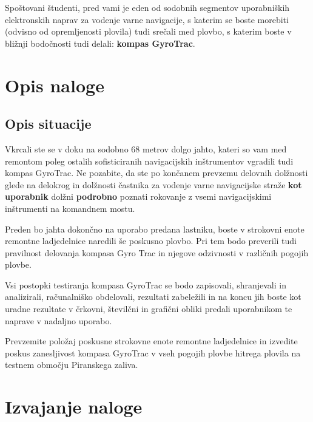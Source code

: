 Spoštovani študenti, pred vami je eden od sodobnih segmentov uporabniških elektronskih naprav za vodenje varne navigacije, s katerim se boste morebiti (odvisno od opremljenosti plovila) tudi srečali med plovbo, s katerim boste v bližnji bodočnosti tudi delali: \textbf{kompas GyroTrac}.

\section{Opis naloge}
\label{sec:VrtKompas_Nalog}

\subsection{Opis situacije}
\label{subsec:Nalog_Situac}
Vkrcali ste se v doku na sodobno 68 metrov dolgo jahto, kateri so vam med remontom poleg ostalih sofisticiranih navigacijskih inštrumentov vgradili tudi kompas GyroTrac. Ne pozabite, da ste po končanem prevzemu delovnih dolžnosti glede na delokrog in dolžnosti častnika za vodenje varne navigacijske straže \textbf{kot uporabnik} dolžni \textbf{podrobno} poznati rokovanje z vsemi navigacijskimi inštrumenti na komandnem mostu.

Preden bo jahta dokončno na uporabo predana lastniku, boste v strokovni enote remontne ladjedelnice naredili še poskusno plovbo. Pri tem bodo preverili tudi pravilnost delovanja kompasa Gyro Trac in njegove odzivnosti v različnih pogojih plovbe.

Vsi postopki testiranja kompasa GyroTrac se bodo zapisovali, shranjevali in analizirali, računalniško obdelovali, rezultati zabeležili in na koncu jih boste kot uradne rezultate v črkovni, številčni in grafični obliki predali uporabnikom te naprave v nadaljno uporabo.

Prevzemite položaj poskusne strokovne enote remontne ladjedelnice in izvedite poskus zanesljivost kompasa GyroTrac v vseh pogojih plovbe hitrega plovila na testnem območju Piranskega zaliva.

\section{Izvajanje naloge}
\label{sec:VrtKompas_Izvaj}

